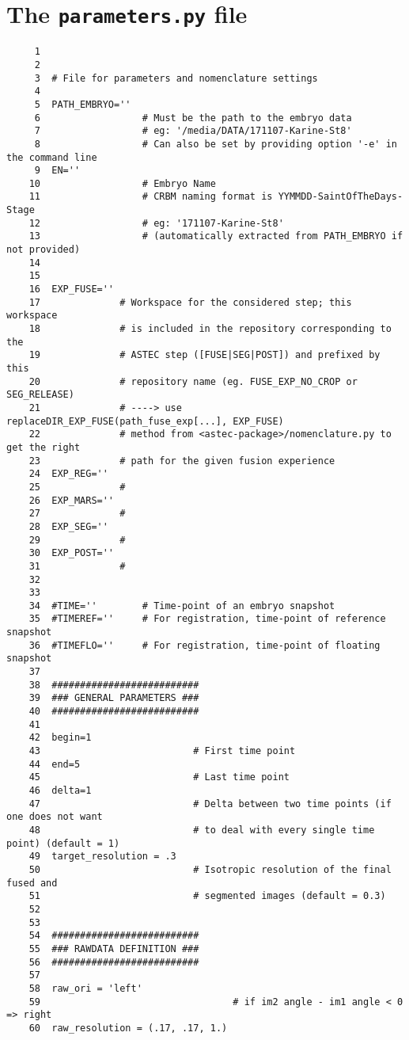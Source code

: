 \section{The \texttt{parameters.py} file}
\label{sec:parameters:original}

\begin{verbatim}
     1	
     2	
     3	# File for parameters and nomenclature settings
     4	
     5	PATH_EMBRYO=''	
     6	                # Must be the path to the embryo data 
     7					# eg: '/media/DATA/171107-Karine-St8'
     8					# Can also be set by providing option '-e' in the command line
     9	EN=''			
    10	                # Embryo Name 
    11	                # CRBM naming format is YYMMDD-SaintOfTheDays-Stage
    12					# eg: '171107-Karine-St8'
    13					# (automatically extracted from PATH_EMBRYO if not provided)
    14	
    15	
    16	EXP_FUSE=''	
    17	            # Workspace for the considered step; this workspace
    18				# is included in the repository corresponding to the
    19				# ASTEC step ([FUSE|SEG|POST]) and prefixed by this
    20				# repository name (eg. FUSE_EXP_NO_CROP or SEG_RELEASE)
    21				# ----> use replaceDIR_EXP_FUSE(path_fuse_exp[...], EXP_FUSE) 
    22				# method from <astec-package>/nomenclature.py to get the right
    23				# path for the given fusion experience
    24	EXP_REG=''	
    25	            #
    26	EXP_MARS=''	
    27	            #
    28	EXP_SEG=''	
    29	            #
    30	EXP_POST=''	
    31	            #
    32	
    33	
    34	#TIME=''		# Time-point of an embryo snapshot 
    35	#TIMEREF=''		# For registration, time-point of reference snapshot
    36	#TIMEFLO=''		# For registration, time-point of floating snapshot
    37	
    38	##########################
    39	### GENERAL PARAMETERS ###
    40	##########################
    41	
    42	begin=1 				 
    43	                         # First time point
    44	end=5   				 
    45	                         # Last time point
    46	delta=1     			 
    47	                         # Delta between two time points (if one does not want
    48							 # to deal with every single time point) (default = 1)
    49	target_resolution = .3   
    50	                         # Isotropic resolution of the final fused and 
    51							 # segmented images (default = 0.3)
    52	
    53	
    54	##########################
    55	### RAWDATA DEFINITION ###
    56	##########################
    57	
    58	raw_ori = 'left' 				
    59	                                # if im2 angle - im1 angle < 0 => right
    60	raw_resolution = (.17, .17, 1.) 

\end{verbatim}
